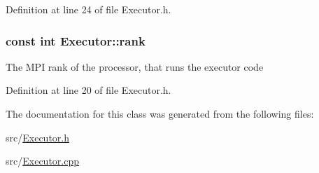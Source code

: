 Definition at line 24 of file Executor.\+h.

\hypertarget{class_executor_a33c24e2887b4d9c4ef7f3566d3bc803e}{}
\subsubsection[{rank}]{\setlength{\rightskip}{0pt plus 5cm}const int Executor\+::rank\hspace{0.3cm}{\ttfamily [protected]}}\label{class_executor_a33c24e2887b4d9c4ef7f3566d3bc803e}
The M\+P\+I rank of the processor, that runs the executor code 

Definition at line 20 of file Executor.\+h.



The documentation for this class was generated from the following files\+:\begin{DoxyCompactItemize}
\item 
src/\hyperlink{_executor_8h}{Executor.\+h}\item 
src/\hyperlink{_executor_8cpp}{Executor.\+cpp}\end{DoxyCompactItemize}
